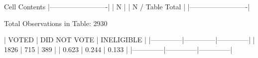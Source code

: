 \begin{Schunk}
\begin{Soutput}
   Cell Contents
|-------------------------|
|                       N |
|         N / Table Total |
|-------------------------|

 
Total Observations in Table:  2930 

 
             |        VOTED | DID NOT VOTE |   INELIGIBLE | 
             |--------------|--------------|--------------|
             |         1826 |          715 |          389 | 
             |        0.623 |        0.244 |        0.133 | 
             |--------------|--------------|--------------|
\end{Soutput}
\end{Schunk}
